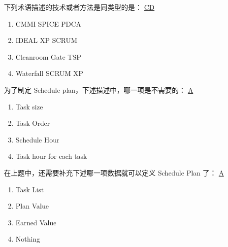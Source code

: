 \begin{problem}
	下列术语描述的技术或者方法是同类型的是：
	\uline{CD}    
    \vspace{-0.8em}
    \begin{multicols}{2}
        \begin{enumerate}[label=\Alph*.]
            \item CMMI SPICE PDCA
            \item IDEAL XP SCRUM
            \item Cleanroom Gate TSP
            \item Waterfall SCRUM XP
        \end{enumerate}
    \end{multicols}
    \vspace{-1em}
\end{problem}



\begin{problem}
	为了制定 Schedule plan，下述描述中，哪一项是不需要的：
	\uline{A}    
    \vspace{-0.8em}
    \begin{multicols}{2}
        \begin{enumerate}[label=\Alph*.]
            \item Task size
            \item Task Order
            \item Schedule Hour
            \item Task hour for each task
        \end{enumerate}
    \end{multicols}
    \vspace{-1em}
\end{problem}




\begin{problem}
	在上题中，还需要补充下述哪一项数据就可以定义 Schedule Plan 了：
	\uline{A}    
    \vspace{-0.8em}
    \begin{multicols}{4}
        \begin{enumerate}[label=\Alph*.]
            \item Task List
            \item Plan Value
            \item Earned Value
            \item Nothing
        \end{enumerate}
    \end{multicols}
    \vspace{-1em}
\end{problem}


